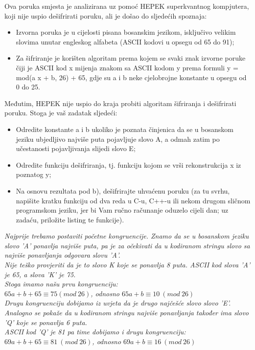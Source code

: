\documentclass[12pt]{article}
\begin{document}
\begin{enumerate}
Ova poruka smjesta je analizirana uz pomoć HEPEK superkvantnog kompjutera, koji nije uspio dešifrirati poruku, ali je došao do sljedećih spoznaja:\\
\begin{itemize}
\item Izvorna poruka je u cijelosti pisana bosanskim jezikom, isključivo velikim slovima unutar engleskog alfabeta (ASCII kodovi u opsegu od 65 do 91);
\item Za šifriranje je korišten algoritam prema kojem se svaki znak izvorne poruke čiji je ASCII kod x mijenja znakom sa ASCII kodom y prema formuli y = mod(a x + b, 26) + 65, gdje su a i b neke cjelobrojne konstante u opsegu od 0 do 25.\\ \newpage
\end{itemize}
Međutim, HEPEK nije uspio do kraja probiti algoritam šifriranja i dešifrirati poruku. Stoga je vaš zadatak sljedeći:\\
\begin{itemize}
\item Odredite konstante a i b ukoliko je poznata činjenica da se u bosanskom jeziku ubjedljivo najviše puta pojavljuje slovo A, a odmah zatim po učestanosti pojavljivanja slijedi slovo E;
\item Odredite funkciju dešifriranja, tj. funkciju kojom se vrši rekonstrukcija x iz poznatog y;
\item Na osnovu rezultata pod b), dešifrirajte uhvaćenu poruku (za tu svrhu, napišite kratku funkciju od dva reda u C-u, C++-u ili nekom drugom sličnom programskom jeziku, jer bi Vam ručno računanje oduzelo cijeli dan; uz zadaću, priložite listing te funkcije).\\
\end{itemize}
        \begin{center}
        \textit{Najprije trebamo postaviti početne kongruencije. Znamo da se u bosanskom jeziku slovo 'A' ponavlja najviše puta, pa je za očekivati da u kodiranom stringu slovo sa najviše ponavljanja odgovara slovu 'A'. \\Nije teško provjeriti da je to slovo K koje se ponavlja 8 puta. ASCII kod slova 'A' je 65, a slova 'K' je 75.\\Stoga imamo našu prvu kongruenciju:\\ $65a +b + 65 \equiv 75 (mod\ 26)$, odnosno $65a +b\equiv 10\ (mod\ 26)$\\Drugu kongruenciju dobijamo iz uvjeta da je drugo najčešće slovo slovo 'E'. Analogno se pokaže da u kodiranom stringu najviše ponavljanja također ima slovo 'Q' koje se ponavlja 6 puta.\\ASCII kod 'Q' je 81 pa time dobijamo i drugu kongruenciju:\\$69a +b + 65 \equiv 81\ (mod\ 26)$, odnosno $69a +b \equiv 16\ (mod\ 26)$}\\

\end{center}
\end{enumerate}
\end{document}
